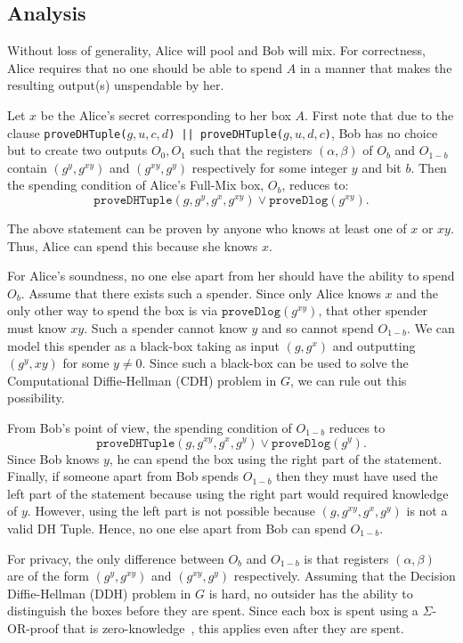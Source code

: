 \documentclass[runningheads]{llncs}
\begin{document}
\subsection{Analysis}

Without loss of generality, Alice will pool and Bob will mix. 
For correctness, Alice requires that no one should be able to spend $A$ in a manner that makes the resulting output(s) unspendable by her.

Let $x$ be the Alice's secret corresponding to her box $A$. First note that due to the clause 
\texttt{proveDHTuple($g, u, c, d$) || proveDHTuple($g, u, d, c$)}, Bob has no choice but to create two outputs $O_0, O_1$ such that the registers $(\alpha, \beta)$ of $O_b$ and $O_{1-b}$ contain $(g^y, g^{xy})$ and $(g^{xy}, g^y)$ respectively for some integer $y$ and bit $b$. Then the spending condition of Alice's Full-Mix box, $O_b$, reduces to:
$$\texttt{proveDHTuple}(g, g^{y}, g^x, g^{xy}) \lor \texttt{proveDlog}(g^{xy}).$$ 

The above statement can be proven by anyone who knows at least one of $x$ or $xy$. 
Thus, Alice can spend this because she knows $x$. 

For Alice's soundness, no one else apart from her should have the ability to spend $O_b$. Assume that there exists such a spender. Since only Alice knows $x$ and the only other way to spend the box is via $\texttt{proveDlog}(g^{xy})$, that other spender must know $xy$. Such a spender cannot know $y$ and so cannot spend $O_{1-b}$. We can model this spender as a black-box taking as input $(g, g^x)$ and outputting $(g^y, xy)$ for some $y\neq 0$. Since such a black-box can be used to solve the Computational Diffie-Hellman (CDH) problem in $G$, we can rule out this possibility.

From Bob's point of view, the spending condition of $O_{1-b}$ reduces to 
$$\texttt{proveDHTuple}(g, g^{xy}, g^x, g^{y}) \lor \texttt{proveDlog}(g^{y}).$$
Since Bob knows $y$, he can spend the box using the right part of the statement. Finally, if someone apart from Bob spends $O_{1-b}$ then they must have used the left part of the statement because using the right part would required knowledge of $y$. However, using the left part is not possible because $(g, g^{xy}, g^x, g^{y})$ is not a valid DH Tuple. Hence, no one else apart from Bob can spend $O_{1-b}$.

For privacy, the only difference between $O_b$ and $O_{1-b}$ is that registers $(\alpha,\beta)$ are of the form $(g^y, g^{xy})$ and $(g^{xy}, g^y)$ respectively. Assuming that the Decision Diffie-Hellman (DDH) problem in $G$ is hard, no outsider has the ability to distinguish the boxes before they are spent. Since each box is spent using a $\Sigma$-OR-proof that is zero-knowledge~\cite{Dam10}, this applies even after they are spent. 
\end{document}
